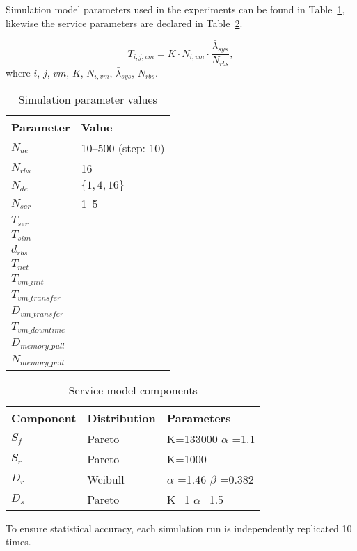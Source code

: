 Simulation model parameters used in the experiments can be found in Table~\ref{table:simulation_parameters}, likewise the service parameters are declared in Table~\ref{table:traffic_parameters}.

\begin{equation}
\label{eq:service_time}
T_{i,j,vm} = K \cdot N_{i,vm} \cdot \frac{ \bar{\lambda}_{sys} }{N_{rbs}},
\end{equation}
where $i$, $j$, $vm$, $K$, $N_{i,vm}$, $\bar{\lambda}_{sys}$, $N_{rbs}$. 

\begin{table}[tb]
 	\centering
 	
    \begin{tabular}{|l|l|} \hline
    	\textbf{Parameter}    	& \textbf{Value}			\\ \hline
    	$N_{ue}$						& 10--500 (step: 10)	\\ \hline
    	$N_{rbs}$						& 16								\\ \hline
    	$N_{dc}$						& $\{1,4,16\}$				\\ \hline
    	$N_{ser}$						& 1--5							\\ \hline
    	$T_{ser}$						& \\ \hline
    	$T_{sim}$						& \\ \hline
    	$d_{rbs}$						& \\ \hline
    	$T_{net}$						& \\ \hline
        $T_{vm\_init}$				& \\ \hline
        $T_{vm\_transfer}$		& \\ \hline
		$D_{vm\_transfer}$		& \\ \hline
		$T_{vm\_downtime}$	& \\ \hline
		$D_{memory\_pull}$	& \\ \hline
		$N_{memory\_pull}$	& \\ \hline
    \end{tabular}
    
    \caption{Simulation parameter values}
    \label{table:simulation_parameters}
\end{table}

\begin{table}[tb]
	\centering
	
    \begin{tabular}{|l|l|l|}\hline
    	\textbf{Component}  	& \textbf{Distribution} 	& \textbf{Parameters}     \\ \hline
    	$S_f$   & Pareto   				& K=133000 $\alpha$ =1.1  \\ \hline
    	$S_r$   & Pareto    				& K=1000         \\ \hline
    	$D_r$ 	& Weibull    				& $\alpha$ =1.46 $\beta$ =0.382 \\ \hline
    	$D_s$ 	& Pareto     				& K=1 $\alpha$=1.5      \\ \hline
    \end{tabular}
    
    \caption{Service model components}
    \label{table:traffic_parameters}
\end{table}

To ensure statistical accuracy, each simulation run is independently replicated 10 times.